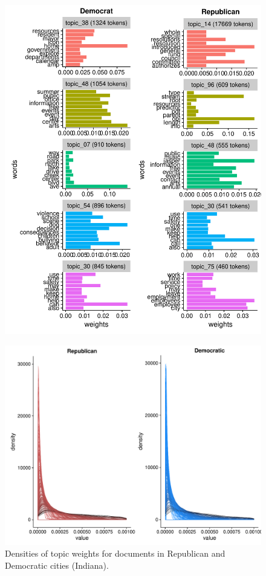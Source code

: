 \documentclass[11pt]{article}
\begin{document}
\begin{figure}[!ht]
	\centering
	\includegraphics[width=\linewidth]{figures/wtp_current_dem_rep_order.pdf}
\end{figure}

\begin{figure}[!ht]
	\centering %
	\caption{Densities of topic weights for documents in Republican and Democratic cities (Indiana).}
	\label{doctopics_density}
	\includegraphics[width=\linewidth]{figures/doctopics_density_IN.pdf}
\end{figure}
\end{document}

